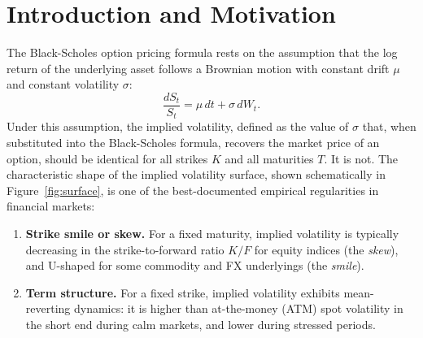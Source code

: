 \documentclass[12pt, a4paper]{article}
\begin{document}
\newpage
\tableofcontents
\newpage

\section{Introduction and Motivation}

The Black-Scholes option pricing formula \citep{black1973} rests on
the assumption that the log return of the underlying asset follows a
Brownian motion with constant drift $\mu$ and constant volatility
$\sigma$:
\begin{equation}
  \frac{dS_t}{S_t} = \mu\,dt + \sigma\,dW_t.
  \label{eq:gbm}
\end{equation}
Under this assumption, the implied volatility, defined as the value of $\sigma$ that, when substituted into the Black-Scholes formula, recovers the market price of an option, should be identical for all strikes $K$ and all maturities $T$. It is not. The characteristic shape of the implied volatility surface, shown schematically in
Figure~\ref{fig:surface}, is one of the best-documented empirical
regularities in financial markets:

\begin{enumerate}[label=(\roman*)]
  \item \textbf{Strike smile or skew.} For a fixed maturity, implied
        volatility is typically decreasing in the strike-to-forward
        ratio $K/F$ for equity indices (the \emph{skew}), and
        U-shaped for some commodity and FX underlyings (the
        \emph{smile}).
  \item \textbf{Term structure.} For a fixed strike, implied volatility
        exhibits mean-reverting dynamics: it is higher than at-the-money
        (ATM) spot volatility in the short end during calm markets, and
        lower during stressed periods.
\end{enumerate}
\end{document}
